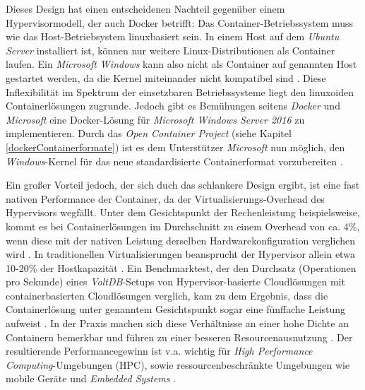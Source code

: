 \documentclass[../main.tex]{subfiles}
\begin{document}
			Dieses Design hat einen entscheidenen Nachteil gegenüber einem Hypervisormodell, der auch Docker betrifft: Das Container-Betriebssystem muss wie das Host-Betriebsystem linuxbasiert sein. In einem Host auf dem \emph{Ubuntu Server} installiert ist, können nur weitere Linux-Distributionen als Container laufen. Ein \emph{Microsoft Windows} kann also nicht als Container auf genannten Host gestartet werden, da die Kernel miteinander nicht kompatibel sind \cite[S.6]{dockerBook}. Diese Inflexibilität im Spektrum der einsetzbaren Betriebssysteme liegt den linuxoiden Containerlösungen zugrunde. Jedoch gibt es Bemühungen seitens \emph{Docker} und \emph{Microsoft} eine Docker-Lösung für \emph{Microsoft Windows Server 2016} zu implementieren. Durch das \emph{Open Container Project} (siehe Kapitel \ref{dockerContainerformate}) ist es dem Unterstützer \emph{Microsoft} nun möglich, den \emph{Windows}-Kernel für das neue standardisierte Containerformat vorzubereiten \cite{dockerWindowsSupport}.

			Ein großer Vorteil jedoch, der sich duch das schlankere Design ergibt, ist eine fast nativen Performance \cite[S.1]{containerVirtPerformance} der Container, da der Virtualisierungs-Overhead des Hypervisors wegfällt. Unter dem Gesichtspunkt der Rechenleistung beispielsweise, kommt es bei Containerlösungen im Durchschnitt zu einem Overhead von ca. 4\%, wenn diese mit der nativen Leistung derselben Hardwarekonfiguration verglichen wird \cite[S.4]{containerVirtPerformance}\cite[S.5]{IBMcontVMcomparison}. In traditionellen Virtualisierungen beansprucht der Hypervisor allein etwa 10-20\% der Hostkapazität \cite[S.2]{dockerIntroIEEE}\cite[S.5]{IBMcontVMcomparison}. Ein Benchmarktest, der den Durchsatz (Operationen pro Sekunde) eines \emph{VoltDB}-Setups\cite{voltdb} von Hypervisor-basierte Cloudlösungen mit containerbasierten \gls{Cloud}lösungen verglich, kam zu dem Ergebnis, dass die Containerlösung unter genanntem Gesichtspunkt sogar eine fünffache Leistung aufweist \cite[S.2+3]{voltdbBenchmark}.
			In der Praxis machen sich diese Verhältnisse an einer hohe Dichte an Containern bemerkbar und führen zu einer besseren Resourcenausnutzung \cite[S.7+8]{dockerBook}. Der resultierende Performancegewinn ist v.a. wichtig für \emph{High Performance Computing}-Umgebungen (\acrshort{HPC}), sowie ressourcenbeschränkte Umgebungen wie mobile Geräte und \emph{Embedded Systems} \cite[S.1]{dockerSec2}.
\end{document}
